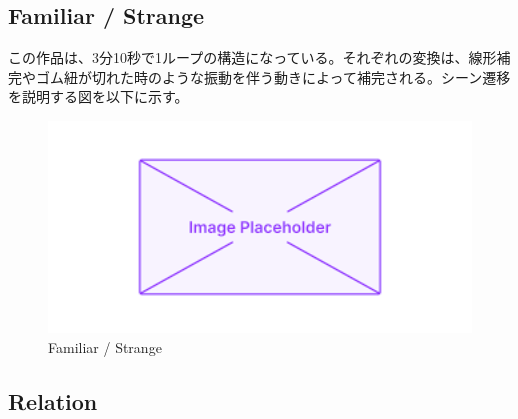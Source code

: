 \subsection{Familiar / Strange}
この作品は、3分10秒で1ループの構造になっている。それぞれの変換は、線形補完やゴム紐が切れた時のような振動を伴う動きによって補完される。シーン遷移を説明する図を以下に示す。
\begin{figure}[H]
  \centering
  \includegraphics[width=15cm]{img/placeholder.png}
  \caption{Familiar / Strange}
  \label{fig:diagram_familiar_strange}
\end{figure}

\subsection{Relation}